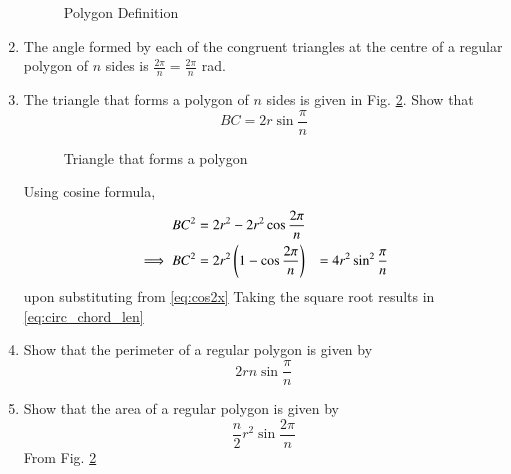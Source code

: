 \begin{enumerate}[label=\arabic*.,ref=\thesubsection.\theenumi]
\begin{figure}[!ht]
\begin{center}
		\resizebox{\columnwidth}{!}{}
	\end{center}
	\caption{Polygon Definition}
	\label{ch5_polygon_def}	
\end{figure}
%
\item
The angle formed by each of the congruent triangles at the centre of a regular polygon of $n$ sides is $\frac{2\pi}{n} = \frac{2\pi}{n}$ rad.
%
\item 	The triangle that forms a polygon of $n$ sides is given in Fig. \ref{ch5_polygon_area}. Show that 
%
\begin{equation}
BC = 2r \sin\frac{\pi}{n}
\label{eq:circ_chord_len}
\end{equation}
%

\begin{figure}[!ht]
	\begin{center}
		
		\resizebox{\columnwidth}{!}{}
	\end{center}
	\caption{Triangle that forms a polygon}
	\label{ch5_polygon_area}	
\end{figure}
%
\solution Using cosine formula, 
%
%
\begin{align}
BC^2 &= 2r^2-2r^2 \cos\frac{2\pi}{n}
\\
\implies BC^2 &= 2r^2\left(1-\cos\frac{2\pi}{n}\right)
&= 4r^2\sin^2\frac{\pi}{n}
\end{align}
%
upon substituting from 	\eqref{eq:cos2x}
Taking the square root results in \eqref{eq:circ_chord_len}
%
\item
Show that the perimeter of a regular polygon is given by 
%
\begin{equation}
\label{eq:peri_poly_n}
2rn \sin\frac{\pi}{n}
\end{equation}
%
\item
Show that the area of a regular polygon is given by 
%
\begin{equation}
\frac{n}{2}r^{2}\sin\frac{2\pi}{n}
\end{equation}
%
\solution  From Fig. 	\ref{ch5_polygon_area}	


\end{enumerate}
